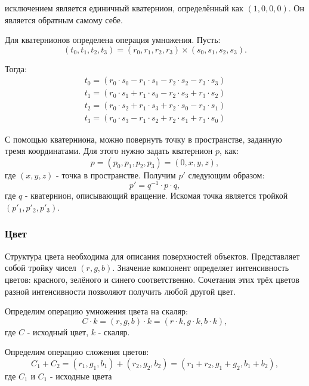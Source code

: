 \documentclass[a4paper, 14pt]{report}
\begin{document}
	исключением является единичный кватернион, определённый как $(1, 0, 0, 0)$. Он является обратным самому себе.
	
	Для кватернионов определена операция умножения. Пусть:
	\begin{equation}
			(t_0, t_1, t_2, t_3) = (r_0, r_1, r_2, r_3)\times(s_0, s_1, s_2, s_3).
	\end{equation}
	
	Тогда:
	\begin{subequations}
		\begin{align}
		t_0=(r_0\cdot s_0-r_1\cdot s_1-r_2\cdot s_2-r_3\cdot s_3) \\
		t_1=(r_0\cdot s_1+r_1\cdot s_0-r_2\cdot s_3+r_3\cdot s_2) \\
		t_2=(r_0\cdot s_2+r_1\cdot s_3+r_2\cdot s_0-r_3\cdot s_1) \\
		t_3=(r_0\cdot s_3-r_1\cdot s_2+r_2\cdot s_1+r_3\cdot s_0)
		\end{align}
	\end{subequations}
	
	С помощью кватерниона, можно повернуть точку в пространстве, заданную тремя координатами. Для этого нужно задать кватернион $p$, как:
	\begin{equation}
		p=(p_0,p_1,p_2,p_3)=(0, x, y, z),
	\end{equation}
	где $(x, y, z)$ - точка в пространстве. Получим $p'$ следующим образом:
	\begin{equation}
		p'=q^{-1}\cdot p\cdot q,
	\end{equation}
	где $q$ - кватернион, описывающий вращение. Искомая точка является тройкой $(p'_1, p'_2, p'_3)$.
	
	\subsubsection{Цвет}
	Структура цвета необходима для описания поверхностей объектов. Представляет собой тройку чисел $(r, g, b)$. Значение компонент определяет интенсивность цветов: красного, зелёного и синего соответственно. Сочетания этих трёх цветов разной интенсивности позволяют получить любой другой цвет.
	
	Определим операцию умножения цвета на скаляр:
	\begin{equation}
		C\cdot k=(r, g, b)\cdot k=(r\cdot k, g\cdot k, b\cdot k),
	\end{equation}
	где $C$ - исходный цвет, $k$ - скаляр.
	
	Определим операцию сложения цветов:
	\begin{equation}
		C_1+C_2=(r_1, g_1, b_1)+(r_2, g_2, b_2)=(r_1+r_2,g_1+g_2,b_1+b_2),
	\end{equation}
	где $C_1$ и $C_1$ - исходные цвета
	
\end{document}
